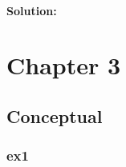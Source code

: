 \documentclass[a4paper,12pt,titlepage]{article} %
\begin{document}
\paragraph{Solution:}




\newpage
\section{Chapter 3}
\subsection{Conceptual}
\subsubsection{ex1}
\end{document}
